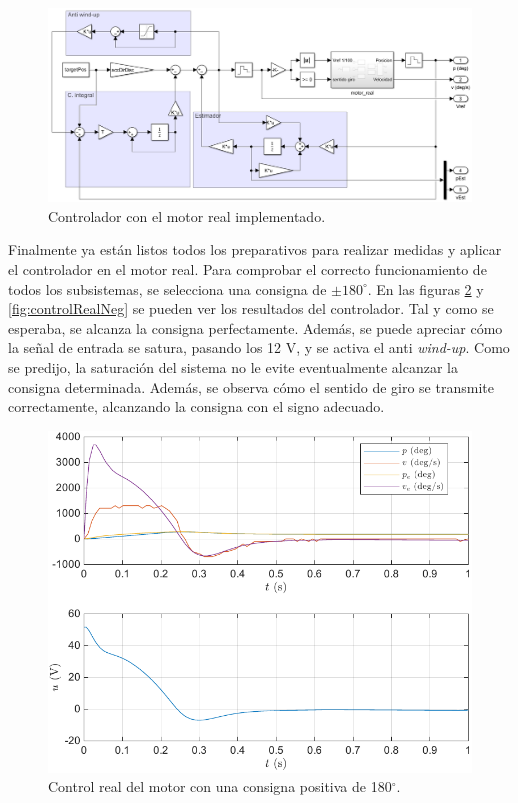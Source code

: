 \documentclass{article}
\newcommand{\degree}[0]{^{\circ}}
\begin{document}
\begin{figure}[H]
    \centering
    \includegraphics[width=0.75\linewidth]{img/controladorReal.png}
    \caption{Controlador con el motor real implementado.}
    \label{fig:controladorReal}
\end{figure}

Finalmente ya están listos todos los preparativos para realizar medidas y aplicar el controlador en el motor real. Para comprobar el correcto funcionamiento de todos los subsistemas, se selecciona una consigna de $\pm180\degree$. En las figuras \ref{fig:controlRealPos} y \ref{fig:controlRealNeg} se pueden ver los resultados del controlador. Tal y como se esperaba, se alcanza la consigna perfectamente. Además, se puede apreciar cómo la señal de entrada se satura, pasando los 12 V, y se activa el anti \textit{wind-up}. Como se predijo, la saturación del sistema no le evite eventualmente alcanzar la consigna determinada. Además, se observa cómo el sentido de giro se transmite correctamente, alcanzando la consigna con el signo adecuado.

\begin{figure}[H]
    \centering
    \includegraphics[width=0.75\linewidth]{img/controlRealPos.pdf}
    \caption{Control real del motor con una consigna positiva de 180$\degree$.}
    \label{fig:controlRealPos}
\end{figure}
\end{document}
